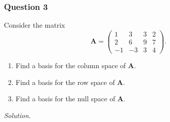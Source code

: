 \documentclass[12pt]{article}
\begin{document}
\subsubsection*{Question 3}
Consider the matrix
\[
  \mathbf{A}=
  \begin{pmatrix}
    1 & 3 & 3 & 2\\
    2 & 6 & 9 & 7\\
   -1 & -3 & 3 & 4
  \end{pmatrix}.
\]
\begin{enumerate}[label=\textbf{(\alph*)}]
\itemsep 0em
  \item Find a basis for the column space of $\mathbf{A}$.
  \item Find a basis for the row space of $\mathbf{A}$.
  \item Find a basis for the null space of $\mathbf{A}$.
\end{enumerate}
\noindent\emph{Solution.}
\end{document}
